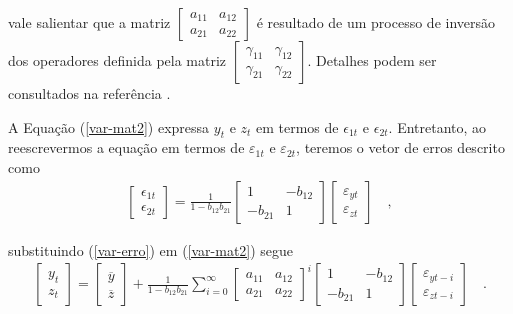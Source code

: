 \noindent vale salientar que a matriz $\begin{bmatrix} a_{11} & a_{12} \\ a_{21} & a_{22} \end{bmatrix}$ é resultado de um processo de inversão dos operadores definida pela matriz $\begin{bmatrix} \gamma_{11} & \gamma_{12} \\ \gamma_{21} & \gamma_{22} \end{bmatrix}$. Detalhes podem ser consultados na referência \cite{enders}.

A Equação (\ref{var-mat2}) expressa $y_t$ e $z_t$ em termos de {$\epsilon_{1t}$} e {$\epsilon_{2t}$}. Entretanto, ao reescrevermos a equação em termos de $\varepsilon_{1t}$ e $\varepsilon_{2t}$, teremos o vetor de erros descrito como
\begin{align}\label{var-erro}
\begin{bmatrix}
    \epsilon_{1t} \\
    \epsilon_{2t}
\end{bmatrix}
=
\frac{1}{1 - b_{12}b_{21}}
\begin{bmatrix}
    1       & -b_{12} \\
    -b_{21} & 1
\end{bmatrix}
\begin{bmatrix}
    \varepsilon_{yt} \\
    \varepsilon_{zt}
\end{bmatrix} \quad,
\end{align}

\noindent substituindo (\ref{var-erro}) em (\ref{var-mat2}) segue
\begin{align} \label{var-mat3}
\begin{bmatrix}
    y_t \\
    z_t
\end{bmatrix}
=
\begin{bmatrix}
    \overline{y} \\
    \overline{z}
\end{bmatrix}
+
\frac{1}{1 - b_{12}b_{21}}
\sum_{i=0}^{\infty}
\begin{bmatrix}
    a_{11} & a_{12} \\
    a_{21} & a_{22} 
\end{bmatrix}^i
\begin{bmatrix}
    1       & -b_{12} \\
    -b_{21} & 1
\end{bmatrix}
\begin{bmatrix}
    \varepsilon_{yt-i} \\
    \varepsilon_{zt-i}
\end{bmatrix} \quad.
\end{align}

